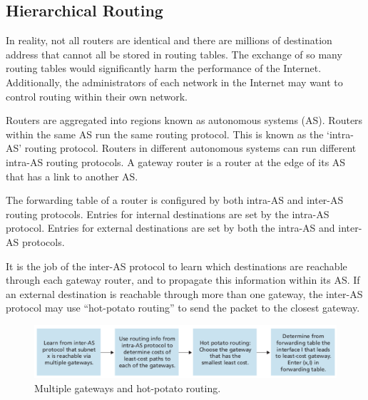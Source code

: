 \subsection{Hierarchical Routing}

In reality, not all routers are identical and there are millions of destination address that cannot all be stored in routing tables.
The exchange of so many routing tables would significantly harm the performance of the Internet.
Additionally, the administrators of each network in the Internet may want to control routing within their own network.

Routers are aggregated into regions known as autonomous systems (AS).
Routers within the same AS run the same routing protocol.
This is known as the `intra-AS' routing protocol.
Routers in different autonomous systems can run different intra-AS routing protocols.
A gateway router is a router at the edge of its AS that has a link to another AS\@.

The forwarding table of a router is configured by both intra-AS and inter-AS routing protocols.
Entries for internal destinations are set by the intra-AS protocol.
Entries for external destinations are set by both the intra-AS and inter-AS protocols.

It is the job of the inter-AS protocol to learn which destinations are reachable through each gateway router, and to propagate this information within its AS\@.
If an external destination is reachable through more than one gateway, the inter-AS protocol may use ``hot-potato routing'' to send the packet to the closest gateway.

\begin{figure}
  \centering
  \includegraphics[width=15cm]{unit-19/figures/hot-potato.png}
  \caption*{Multiple gateways and hot-potato routing.}
\end{figure}
